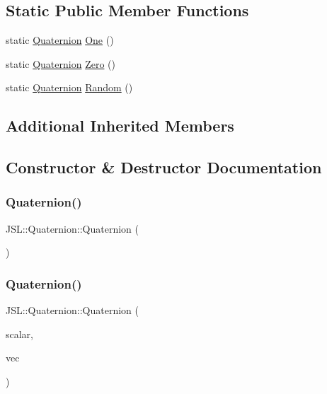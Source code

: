 \subsection*{Static Public Member Functions}
\begin{DoxyCompactItemize}
\item 
static \hyperlink{classJSL_1_1Quaternion}{Quaternion} \hyperlink{classJSL_1_1Quaternion_adf0c22bf67a2ab873b998b34583de2e0}{One} ()
\item 
static \hyperlink{classJSL_1_1Quaternion}{Quaternion} \hyperlink{classJSL_1_1Quaternion_a63e84edb5230efc8378d86b5d182221d}{Zero} ()
\item 
static \hyperlink{classJSL_1_1Quaternion}{Quaternion} \hyperlink{classJSL_1_1Quaternion_a8d47df19d5d74b82a8e348391e8ef8c4}{Random} ()
\end{DoxyCompactItemize}
\subsection*{Additional Inherited Members}


\subsection{Constructor \& Destructor Documentation}
\mbox{\label{classJSL_1_1Quaternion_a3bfe577832b38cdf2dbbb143c9487add}} 
\subsubsection{\texorpdfstring{Quaternion()}{Quaternion()}\hspace{0.1cm}{\footnotesize\ttfamily [1/5]}}
{\footnotesize\ttfamily J\+S\+L\+::\+Quaternion\+::\+Quaternion (\begin{DoxyParamCaption}{ }\end{DoxyParamCaption})\hspace{0.3cm}{\ttfamily [inline]}}

\mbox{\label{classJSL_1_1Quaternion_ae31be96e94176f1e5278cfaeba39dedc}} 
\subsubsection{\texorpdfstring{Quaternion()}{Quaternion()}\hspace{0.1cm}{\footnotesize\ttfamily [2/5]}}
{\footnotesize\ttfamily J\+S\+L\+::\+Quaternion\+::\+Quaternion (\begin{DoxyParamCaption}\item[{const double \&}]{scalar,  }\item[{const \hyperlink{classJSL_1_1Vector}{J\+S\+L\+::\+Vector} \&}]{vec }\end{DoxyParamCaption})\hspace{0.3cm}{\ttfamily [inline]}}

